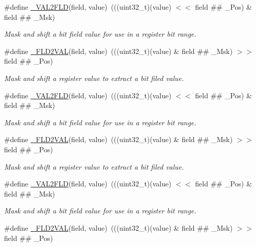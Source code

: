 \begin{DoxyCompactItemize}
\#define \hyperlink{group___c_m_s_i_s__core__bitfield_ga286e3b913dbd236c7f48ea70c8821f4e}{\+\_\+\+V\+A\+L2\+F\+LD}(field,  value)~(((uint32\+\_\+t)(value) $<$$<$ field \#\# \+\_\+\+Pos) \& field \#\# \+\_\+\+Msk)
\begin{DoxyCompactList}\small\item\em Mask and shift a bit field value for use in a register bit range. \end{DoxyCompactList}\item 
\#define \hyperlink{group___c_m_s_i_s__core__bitfield_ga139b6e261c981f014f386927ca4a8444}{\+\_\+\+F\+L\+D2\+V\+AL}(field,  value)~(((uint32\+\_\+t)(value) \& field \#\# \+\_\+\+Msk) $>$$>$ field \#\# \+\_\+\+Pos)
\begin{DoxyCompactList}\small\item\em Mask and shift a register value to extract a bit filed value. \end{DoxyCompactList}\item 
\#define \hyperlink{group___c_m_s_i_s__core__bitfield_ga286e3b913dbd236c7f48ea70c8821f4e}{\+\_\+\+V\+A\+L2\+F\+LD}(field,  value)~(((uint32\+\_\+t)(value) $<$$<$ field \#\# \+\_\+\+Pos) \& field \#\# \+\_\+\+Msk)
\begin{DoxyCompactList}\small\item\em Mask and shift a bit field value for use in a register bit range. \end{DoxyCompactList}\item 
\#define \hyperlink{group___c_m_s_i_s__core__bitfield_ga139b6e261c981f014f386927ca4a8444}{\+\_\+\+F\+L\+D2\+V\+AL}(field,  value)~(((uint32\+\_\+t)(value) \& field \#\# \+\_\+\+Msk) $>$$>$ field \#\# \+\_\+\+Pos)
\begin{DoxyCompactList}\small\item\em Mask and shift a register value to extract a bit filed value. \end{DoxyCompactList}\item 
\#define \hyperlink{group___c_m_s_i_s__core__bitfield_ga286e3b913dbd236c7f48ea70c8821f4e}{\+\_\+\+V\+A\+L2\+F\+LD}(field,  value)~(((uint32\+\_\+t)(value) $<$$<$ field \#\# \+\_\+\+Pos) \& field \#\# \+\_\+\+Msk)
\begin{DoxyCompactList}\small\item\em Mask and shift a bit field value for use in a register bit range. \end{DoxyCompactList}\item 
\#define \hyperlink{group___c_m_s_i_s__core__bitfield_ga139b6e261c981f014f386927ca4a8444}{\+\_\+\+F\+L\+D2\+V\+AL}(field,  value)~(((uint32\+\_\+t)(value) \& field \#\# \+\_\+\+Msk) $>$$>$ field \#\# \+\_\+\+Pos)

\end{DoxyCompactItemize}
